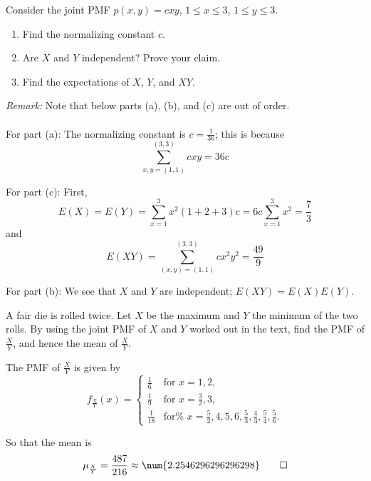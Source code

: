 \begin{problem}[Handout 15, \# 11]
  Consider the joint PMF \(p(x,y)=cxy\), \(1\leq x\leq 3\), \(1\leq y\leq
  3\).
  \begin{enumerate}[label=(\alph*),noitemsep]
  \item Find the normalizing constant \(c\).
  \item Are \(X\) and \(Y\) independent? Prove your claim.
  \item Find the expectations of \(X\), \(Y\), and \(XY\).
  \end{enumerate}
\end{problem}
\begin{solution}
  \emph{Remark:} Note that below parts (a), (b), and (c) are out of order.
  \\\\
  For part (a): The normalizing constant is $c=\frac{1}{36}$; this is
  because
  \[
    \sum_{x,y =(1,1)}^{(3,3)} cxy = 36c
  \]

  For part (c): First,
  \[
    E(X) = E(Y) = \sum_{x=1}^3 x^2(1+2+3)c = 6c \sum_{x=1}^3
    x^2 = \frac{7}{3}
  \]
  and
  \[
    E(XY) = \sum_{(x,y) = (1,1)}^{(3,3)} cx^2y^2 =\frac{49}{9}
  \]

  For part (b): We see that $X$ and $Y$ are independent;
  $E(XY) = E(X)E(Y)$.
\end{solution}
\newpage

\begin{problem}[Handout 15, \# 12]
  A fair die is rolled twice. Let \(X\) be the maximum and \(Y\) the
  minimum of the two rolls. By using the joint PMF of \(X\) and \(Y\)
  worked out in the text, find the PMF of \(\frac{X}{Y}\), and hence the
  mean of \(\frac{X}{Y}\).
\end{problem}
\begin{solution}
  The PMF of $\frac{X}{Y}$ is given by
  \[
    f_{\frac{X}{Y}}(x)=
    \begin{cases}
      \frac{1}{6}&\text{for \(x=1,2\),} \\
      \frac{1}{9}&\text{for \(x=\frac{3}{2},3\),} \\
      \frac{1}{18}&\text{for%
        \(x=\frac{5}{2},%
        4,5,6,\frac{5}{3},%
        \frac{4}{3},\frac{5}{4},%
        \frac{5}{6}\).}
    \end{cases}
  \]

  So that the mean is
  \[
    \mu_{\frac{X}{Y}} = \frac{487}{216} \approx\num{2.2546296296296298}\qedhere
  \]
\end{solution}
\newpage

